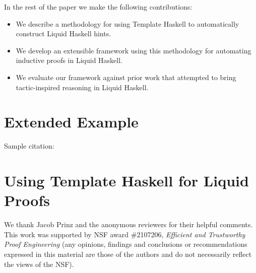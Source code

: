 \documentclass[sigplan,screen]{acmart}
\begin{document}
In the rest of the paper we make the following contributions:
\begin{itemize}
\item We describe a methodology for using Template Haskell to automatically construct Liquid Haskell hints.
\item We develop an extensible framework using this methodology for automating inductive proofs in Liquid Haskell.
\item We evaluate our framework against prior work that attempted to
  bring tactic-inspired reasoning in Liquid Haskell.
\end{itemize}

\section{Extended Example}


Sample citation: \cite{liu20typeclasses}

\section{Using Template Haskell for Liquid Proofs}


%



\begin{acks}
  We thank Jacob Prinz and the anonymous reviewers for their helpful
  comments.  This work was supported by NSF award \#2107206, {\em
    Efficient and Trustworthy Proof Engineering} (any opinions,
  findings and conclusions or recommendations expressed in this
  material are those of the authors and do not necessarily reflect the
  views of the NSF).
\end{acks}





\end{document}

